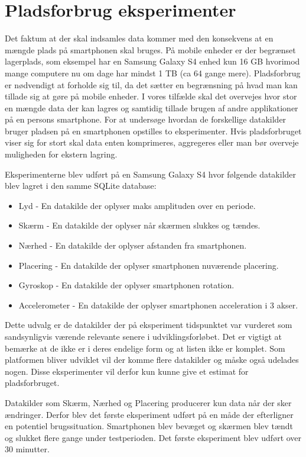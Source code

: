 \section{Pladsforbrug eksperimenter}\label{eksperimenter}
Det faktum at der skal indsamles data kommer med den konsekvens at en mængde plads på smartphonen skal bruges.
På mobile enheder er der begrænset lagerplads, som eksempel har en Samsung Galaxy S4 enhed kun 16 GB hvorimod mange computere nu om dage har mindst 1 TB (ca 64 gange mere).
Pladsforbrug er nødvendigt at forholde sig til, da det sætter en begrænsning på hvad man kan tillade sig at gøre på mobile enheder.
I vores tilfælde skal det overvejes hvor stor en mængde data der kan lagres og samtidig tillade brugen af andre applikationer på en persons smartphone.
For at undersøge hvordan de forskellige datakilder bruger pladsen på en smartphonen opstilles to eksperimenter.
Hvis pladsforbruget viser sig for stort skal data enten komprimeres, aggregeres eller man bør overveje muligheden for ekstern lagring.

Eksperimenterne blev udført på en Samsung Galaxy S4 hvor følgende datakilder blev lagret i den samme SQLite database:

\begin{itemize}
	\item Lyd - En datakilde der oplyser maks amplituden over en periode.
	\item Skærm - En datakilde der oplyser når skærmen slukkes og tændes.
	\item Nærhed - En datakilde der oplyser afstanden fra smartphonen.
	\item Placering - En datakilde der oplyser smartphonen nuværende placering.
	\item Gyroskop - En datakilde der oplyser smartphonen rotation.
	\item Accelerometer - En datakilde der oplyser smartphonen acceleration i 3 akser.
\end{itemize}

Dette udvalg er de datakilder der på eksperiment tidspunktet var vurderet som sandsynligvis værende relevante senere i udviklingsforløbet.
Det er vigtigt at bemærke at de ikke er i deres endelige form og at listen ikke er komplet.
Som platformen bliver udviklet vil der komme flere datakilder og måske også udelades nogen.
Disse eksperimenter vil derfor kun kunne give et estimat for pladsforbruget.

Datakilder som Skærm, Nærhed og Placering producerer kun data når der sker ændringer. 
Derfor blev det første eksperiment udført på en måde der efterligner en potentiel brugssituation. 
Smartphonen blev bevæget og skærmen blev tændt og slukket flere gange under testperioden.
Det første eksperiment blev udført over 30 minutter.

